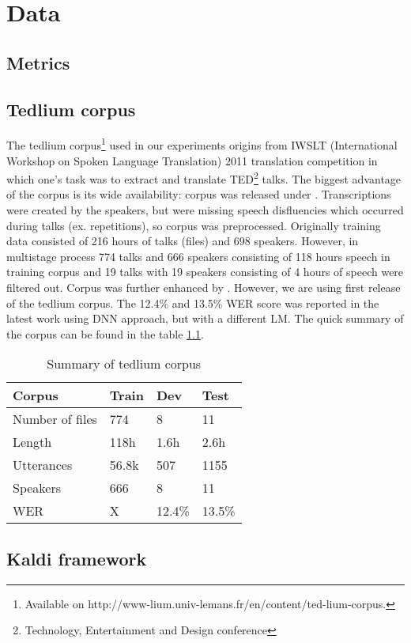 \chapter{Data}

\section{Metrics}


\section{Tedlium corpus}


The tedlium corpus\footnote{Available on http://www-lium.univ-lemans.fr/en/content/ted-lium-corpus. } used in our experiments origins from IWSLT (International Workshop on Spoken Language Translation) 2011 translation competition in which one's task was to extract and translate TED\footnote{Technology, Entertainment and Design conference} talks. The biggest advantage of the corpus is its wide availability: corpus was released \parencite{rousseau_ted-lium:_2012} under \textcite{_creative_????}. Transcriptions were created by the speakers, but were missing speech disfluencies which occurred during talks (ex. repetitions), so corpus was preprocessed. Originally training data consisted of 216 hours of talks (files) and 698 speakers. However, in multistage process 774 talks and 666 speakers consisting of 118 hours speech in training corpus and 19 talks with 19 speakers consisting of 4 hours of speech were filtered out. Corpus was further enhanced by \textcite{rousseau_enhancing_2014}. However, we are using first release of the tedlium corpus. The 12.4\% and 13.5\% WER score was reported in the latest work using DNN approach, but with a different LM. The quick summary of the corpus can be found in the table \ref{tedlium_corpus_table}.  

\begin{table}[h!]
\centering
\begin{tabular}{ llll } 
\toprule
 Corpus & Train & Dev & Test \\ 
\midrule
 Number of files & 774 & 8 & 11 \\ 
 Length & 118h & 1.6h  & 2.6h  \\ 
 Utterances & 56.8k & 507 & 1155 \\ 
 Speakers & 666 & 8 & 11 \\ 
 WER & X & 12.4\% & 13.5\% \\ 
 \bottomrule
\end{tabular} 
\caption{Summary of tedlium corpus}
\label{tedlium_corpus_table}
\end{table}



\begin{comment}
\section{Language model}
Recurrent: \cite{williams_scaling_2015}

\end{comment}

\section{Kaldi framework}

